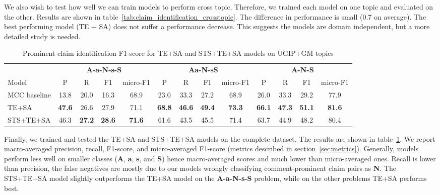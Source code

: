 We also wish to test how well we can train models to perform cross topic. 
Therefore, we trained each model on one topic and evaluated on the other. 
Results are shown in table~\ref{tab:claim_identification_crosstopic}. 
The difference in performance is small (0.7 on average). 
The best performing model (TE + SA) does not suffer a performance decrease. 
This suggests the models are domain independent, but a more detailed study is needed. 

\begin{table}
\setlength{\tabcolsep}{5pt}
\centering
{\small
\begin{tabular}{l cccc cccc cccc}
\toprule
& \multicolumn{4}{c}{\textbf{A-a-N-s-S}} & \multicolumn{4}{c}{\textbf{Aa-N-sS}} & 
\multicolumn{4}{c}{\textbf{A-N-S}}\\
\cmidrule(lr){2-5}
\cmidrule(lr){6-9}
\cmidrule(lr){10-13}
Model
& P & R & F1 & micro-F1 & P & R & F1 & micro-F1 & P & R & F1 & micro-F1 \\
\midrule
MCC baseline & 13.8 & 20.0 & 16.3 & 68.9 & 23.0 & 33.3 & 27.2 & 68.9 & 26.0 & 33.3 & 29.2 & 77.9\\
TE+SA & \textbf{47.6} & 26.6 & 27.9 & 71.1 & \textbf{68.8} & \textbf{46.6} & \textbf{49.4} & \textbf{73.3} & \textbf{66.1} & \textbf{47.3} & \textbf{51.1} & \textbf{81.6} \\
STS+TE+SA & 46.3 & \textbf{27.2} & \textbf{28.6} & \textbf{71.6} & 61.6 & 43.5 & 45.5 & 71.4  & 63.7 & 44.9 & 48.2 & 80.4 \\
\bottomrule
\end{tabular}}
\caption{Prominent claim identification F1-score for TE+SA and STS+TE+SA models on UGIP+GM topics}
\label{tab:claim_identification_best}
\end{table}

Finally, we trained and tested the TE+SA and STS+TE+SA models on the complete 
\ComArg dataset. 
The results are shown in table~\ref{tab:claim_identification_best}. 
We report macro-averaged precision, recall, F1-score, and 
micro-averaged F1-score (metrics described in section~\ref{sec:metrics}). 
Generally, models perform less well on smaller classes (\textbf{A},
\textbf{a}, \textbf{s}, and \textbf{S}) hence macro-averaged scores and much lower than
micro-averaged ones. 
Recall is lower than precision, the false negatives are mostly due to our models
wrongly classifying comment-prominent claim pairs as \textbf{N}. 
The STS+TE+SA model slightly outperforms the TE+SA model on the \textbf{A-a-N-s-S} problem,
while on the other problems TE+SA performs best. 

